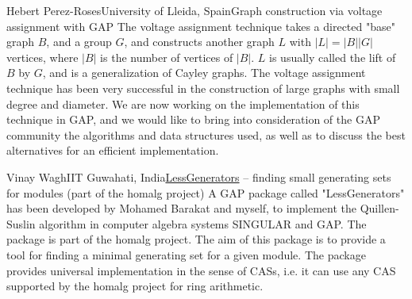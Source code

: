 \documentclass[11pt,a4paper]{article}
\begin{document}
\begin{Abstract}{Hebert Perez-Roses}{University of Lleida, Spain}{Graph construction via voltage assignment with GAP}
The voltage assignment technique takes a directed "base" graph $B$, and a
group $G$, and constructs another graph $L$ with $|L|=|B||G|$ vertices, where
$|B|$ is the number of vertices of $|B|$. $L$ is usually called the lift of $B$
by $G$, and is a generalization of Cayley graphs. The voltage assignment
technique has been very successful in the construction of large graphs
with small degree and diameter. We are now working on the implementation
of this technique in GAP, and we would like to bring into consideration
of the GAP community the algorithms and data structures used, as well as
to discuss the best alternatives for an efficient implementation.
\end{Abstract}


\begin{Abstract}{Vinay Wagh}{IIT Guwahati, India}{\href{https://github.com/homalg-project/LessGenerators}{LessGenerators} -- finding small generating sets for modules (part of the homalg project)}
	A GAP package called "LessGenerators" has been developed by Mohamed Barakat and myself, to implement the Quillen-Suslin algorithm in computer algebra systems SINGULAR and GAP. The package is part of the homalg project. The aim of this package is to provide a tool for finding a minimal generating set for a given module. The package provides universal implementation in the sense of CASs, i.e. it can use any CAS supported by the homalg project for ring arithmetic.
\end{Abstract}
\end{document}
